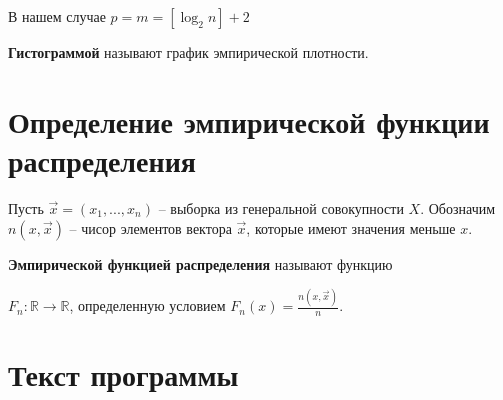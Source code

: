 \documentclass[a4paper,14pt]{extreport} %
\begin{document}
    \hfill
    
    В нашем случае $p=m=[\log_2n] +2$
    
    \hfill

\textbf{Гистограммой} называют график эмпирической плотности. 

\section{Определение эмпирической функции распределения}

\hfill 

Пусть $\vec x = (x_1, ..., x_n)$ -- выборка из генеральной совокупности $X$. Обозначим $n(x, \vec x)$ -- чисор элементов вектора $\vec x$, которые имеют значения меньше $x$.

\hfill

\textbf{Эмпирической функцией распределения} называют функцию 

$F_n : \mathbb{R} \to \mathbb{R}$, определенную условием $F_n(x) = \frac{n(x, \vec x)}{n}$. 

\section{Текст программы}

\hfill 
\end{document}
